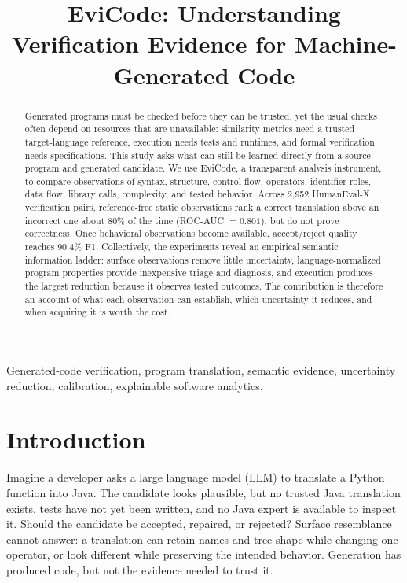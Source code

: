 ﻿\documentclass[conference]{IEEEtran}
\title{EviCode: Understanding Verification Evidence for Machine-Generated Code}
\author{}
\begin{document}
\maketitle

\begin{abstract}
Generated programs must be checked before they can be trusted, yet the usual checks often depend on resources that are unavailable: similarity metrics need a trusted target-language reference, execution needs tests and runtimes, and formal verification needs specifications. This study asks what can still be learned directly from a source program and generated candidate. We use EviCode, a transparent analysis instrument, to compare observations of syntax, structure, control flow, operators, identifier roles, data flow, library calls, complexity, and tested behavior. Across 2,952 HumanEval-X verification pairs, reference-free static observations rank a correct translation above an incorrect one about 80\% of the time (ROC-AUC $=0.801$), but do not prove correctness. Once behavioral observations become available, accept/reject quality reaches 90.4\% F1. Collectively, the experiments reveal an empirical semantic information ladder: surface observations remove little uncertainty, language-normalized program properties provide inexpensive triage and diagnosis, and execution produces the largest reduction because it observes tested outcomes. The contribution is therefore an account of what each observation can establish, which uncertainty it reduces, and when acquiring it is worth the cost.
\end{abstract}

\begin{IEEEkeywords}
Generated-code verification, program translation, semantic evidence, uncertainty reduction, calibration, explainable software analytics.
\end{IEEEkeywords}

\section{Introduction}
Imagine a developer asks a large language model (LLM) to translate a Python function into Java. The candidate looks plausible, but no trusted Java translation exists, tests have not yet been written, and no Java expert is available to inspect it. Should the candidate be accepted, repaired, or rejected? Surface resemblance cannot answer: a translation can retain names and tree shape while changing one operator, or look different while preserving the intended behavior. Generation has produced code, but not the evidence needed to trust it.
\end{document}
